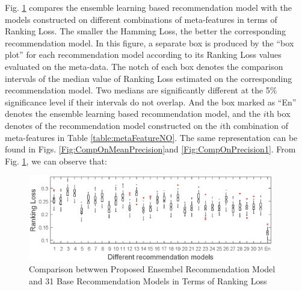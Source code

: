 \documentclass[acmsmall]{acmart}
\begin{document}
Fig. \ref{Fig:CompOnHammLoss} compares the ensemble learning based
recommendation model with the models constructed on different
combinations of meta-features in terms of Ranking Loss. The smaller
the Hamming Loss, the better the corresponding recommendation model.
In this figure, a separate box is produced by the ``box plot'' for
each recommendation model according to its Ranking Loss values
evaluated on the meta-data. The notch of each box denotes the
comparison intervals of the median value of Ranking Loss estimated
on the corresponding recommendation model. Two medians are
significantly different at the 5\% significance level if their
intervals do not overlap. And the box marked as ``En'' denotes the
ensemble learning based recommendation model, and the $i$th box
denotes of the recommendation model constructed on the $i$th
combination of meta-features in Table \ref{table:metaFeatureNO}. The
same representation can be found in Figs.
\ref{Fig:CompOnMeanPrecision}and \ref{Fig:CompOnPrecision1}. From
Fig. \ref{Fig:CompOnHammLoss}, we can observe that:

\begin{figure}[!h]
	\centering
	\includegraphics[width=0.95\textwidth]{Figures/RankLossComparison}
	\caption{Comparison betwwen Proposed Ensembel Recommendation Model and 31 Base Recommendation Models in Terms of Ranking Loss}\label{Fig:CompOnHammLoss}
\end{figure}
\end{document}

